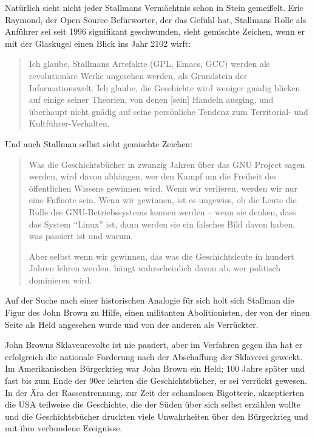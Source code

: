 Natürlich sieht nicht jeder Stallmans Vermächtnis schon in Stein gemeißelt. Eric Raymond, der Open-Source-Befürworter, der das Gefühl hat, Stallmans Rolle als Anführer sei seit 1996 signifikant geschwunden, sieht gemischte Zeichen, wenn er mit der Glaskugel einen Blick ins Jahr 2102 wirft:

\begin{quote}
Ich glaube, Stallmans Artefakte (GPL, Emacs, GCC) werden als revolutionäre Werke angesehen werden, als Grundstein der Informationswelt. Ich glaube, die Geschichte wird weniger gnädig blicken auf einige seiner Theorien, von denen [sein] Handeln ausging, und überhaupt nicht gnädig auf seine persönliche Tendenz zum Territorial- und Kultführer-Verhalten.
\end{quote}

Und auch Stallman selbst sieht gemischte Zeichen:

\begin{quote}
Was die Geschichtsbücher in zwanzig Jahren über das GNU Project sagen werden, wird davon abhängen, wer den Kampf um die Freiheit des öffentlichen Wissens gewinnen wird. Wenn wir verlieren, werden wir nur eine Fußnote sein. Wenn wir gewinnen, ist es ungewiss, ob die Leute die Rolle des GNU-Betriebssystems kennen werden – wenn sie denken, dass das System "`Linux"' ist, dann werden sie ein falsches Bild davon haben, was passiert ist und warum.

Aber selbst wenn wir gewinnen, das was die Geschichtsleute in hundert Jahren lehren werden, hängt wahrscheinlich davon ab, wer politisch dominieren wird.
\end{quote}

Auf der Suche nach einer historischen Analogie für sich holt sich Stallman die Figur des John Brown zu Hilfe, einen militanten Abolitionisten, der von der einen Seite als Held angesehen wurde und von der anderen als Verrückter.

John Browns Sklavenrevolte ist nie passiert, aber im Verfahren gegen ihn hat er erfolgreich die nationale Forderung nach der Abschaffung der Sklaverei geweckt. Im Amerikanischen Bürgerkrieg war John Brown ein Held; 100 Jahre später und fast bis zum Ende der 90er lehrten die Geschichtsbücher, er sei verrückt gewesen. In der Ära der Rassentrennung, zur Zeit der schamlosen Bigotterie, akzeptierten die USA teilweise die Geschichte, die der Süden über sich selbst erzählen wollte und die Geschichtsbücher druckten viele Unwahrheiten über den Bürgerkrieg und mit ihm verbundene Ereignisse.

